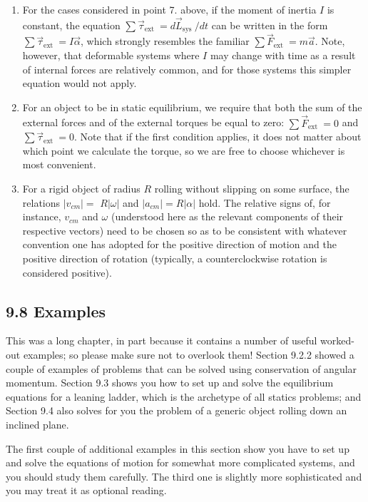 \documentclass[10pt]{article}
\begin{document}
\begin{enumerate}
  \item For the cases considered in point 7. above, if the moment of inertia $I$ is constant, the equation $\sum \vec{\tau}_{\text {ext }}=d \vec{L}_{\text {sys }} / d t$ can be written in the form $\sum \vec{\tau}_{\text {ext }}=I \vec{\alpha}$, which strongly resembles the familiar $\sum \vec{F}_{\text {ext }}=m \vec{a}$. Note, however, that deformable systems where $I$ may change with time as a result of internal forces are relatively common, and for those systems this simpler equation would not apply.
  \item For an object to be in static equilibrium, we require that both the sum of the external forces and of the external torques be equal to zero: $\sum \vec{F}_{\text {ext }}=0$ and $\sum \vec{\tau}_{\text {ext }}=0$. Note that if the first condition applies, it does not matter about which point we calculate the torque, so we are free to choose whichever is most convenient.
  \item For a rigid object of radius $R$ rolling without slipping on some surface, the relations $\left|v_{c m}\right|=$ $R|\omega|$ and $\left|a_{c m}\right|=R|\alpha|$ hold. The relative signs of, for instance, $v_{c m}$ and $\omega$ (understood here as the relevant components of their respective vectors) need to be chosen so as to be consistent with whatever convention one has adopted for the positive direction of motion and the positive direction of rotation (typically, a counterclockwise rotation is considered positive).
\end{enumerate}

\subsection*{9.8 Examples}
This was a long chapter, in part because it contains a number of useful worked-out examples; so please make sure not to overlook them! Section 9.2.2 showed a couple of examples of problems that can be solved using conservation of angular momentum. Section 9.3 shows you how to set up and solve the equilibrium equations for a leaning ladder, which is the archetype of all statics problems; and Section 9.4 also solves for you the problem of a generic object rolling down an inclined plane.

The first couple of additional examples in this section show you have to set up and solve the equations of motion for somewhat more complicated systems, and you should study them carefully. The third one is slightly more sophisticated and you may treat it as optional reading.
\end{document}
